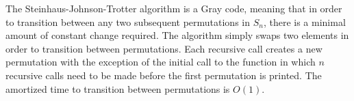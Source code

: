         

The Steinhaus-Johnson-Trotter algorithm is a Gray code, meaning that in order to transition 
between any two subsequent permutations in $S_{n}$, there is a minimal amount of constant 
change required. The algorithm simply swaps two elements in order to transition between 
permutations. Each recursive call creates a new permutation with the exception of the 
initial call to the function in which $n$ recursive calls need to be made before the 
first permutation is printed. The amortized time to transition between permutations is $O(1)$.





